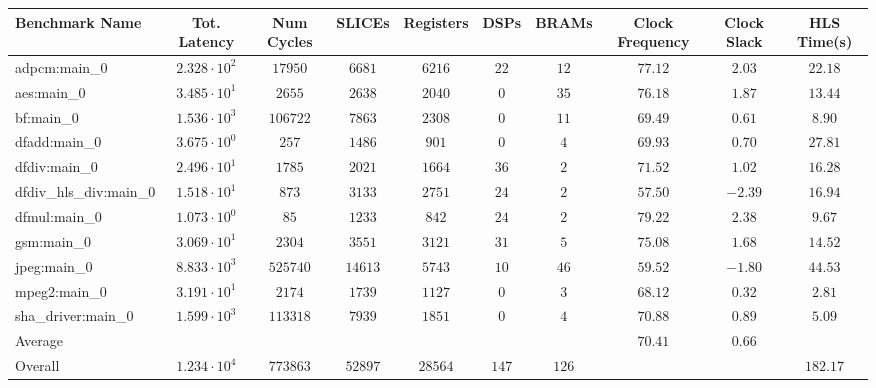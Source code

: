 \begin{tabular}{|l|c|c|c|c|c|c|c|c|c|}
\hline
Benchmark Name          & Tot. Latency           & Num Cycles & SLICEs    & Registers & DSPs    & BRAMs   & Clock Frequency & Clock Slack & HLS Time(s) \\
\hline
adpcm:main\_0           & $ 2.328 \cdot 10^{2} $ & $ 17950  $ & $ 6681  $ & $ 6216  $ & $ 22  $ & $ 12  $ & $ 77.12       $ & $ 2.03    $ & $ 22.18   $ \\
aes:main\_0             & $ 3.485 \cdot 10^{1} $ & $ 2655   $ & $ 2638  $ & $ 2040  $ & $ 0   $ & $ 35  $ & $ 76.18       $ & $ 1.87    $ & $ 13.44   $ \\
bf:main\_0              & $ 1.536 \cdot 10^{3} $ & $ 106722 $ & $ 7863  $ & $ 2308  $ & $ 0   $ & $ 11  $ & $ 69.49       $ & $ 0.61    $ & $ 8.90    $ \\
dfadd:main\_0           & $ 3.675 \cdot 10^{0} $ & $ 257    $ & $ 1486  $ & $ 901   $ & $ 0   $ & $ 4   $ & $ 69.93       $ & $ 0.70    $ & $ 27.81   $ \\
dfdiv:main\_0           & $ 2.496 \cdot 10^{1} $ & $ 1785   $ & $ 2021  $ & $ 1664  $ & $ 36  $ & $ 2   $ & $ 71.52       $ & $ 1.02    $ & $ 16.28   $ \\
dfdiv\_hls\_div:main\_0 & $ 1.518 \cdot 10^{1} $ & $ 873    $ & $ 3133  $ & $ 2751  $ & $ 24  $ & $ 2   $ & $ 57.50       $ & $ -2.39   $ & $ 16.94   $ \\
dfmul:main\_0           & $ 1.073 \cdot 10^{0} $ & $ 85     $ & $ 1233  $ & $ 842   $ & $ 24  $ & $ 2   $ & $ 79.22       $ & $ 2.38    $ & $ 9.67    $ \\
gsm:main\_0             & $ 3.069 \cdot 10^{1} $ & $ 2304   $ & $ 3551  $ & $ 3121  $ & $ 31  $ & $ 5   $ & $ 75.08       $ & $ 1.68    $ & $ 14.52   $ \\
jpeg:main\_0            & $ 8.833 \cdot 10^{3} $ & $ 525740 $ & $ 14613 $ & $ 5743  $ & $ 10  $ & $ 46  $ & $ 59.52       $ & $ -1.80   $ & $ 44.53   $ \\
mpeg2:main\_0           & $ 3.191 \cdot 10^{1} $ & $ 2174   $ & $ 1739  $ & $ 1127  $ & $ 0   $ & $ 3   $ & $ 68.12       $ & $ 0.32    $ & $ 2.81    $ \\
sha\_driver:main\_0     & $ 1.599 \cdot 10^{3} $ & $ 113318 $ & $ 7939  $ & $ 1851  $ & $ 0   $ & $ 4   $ & $ 70.88       $ & $ 0.89    $ & $ 5.09    $ \\
\hline
Average                 & $                    $ & $        $ & $       $ & $       $ & $     $ & $     $ & $ 70.41       $ & $ 0.66    $ & $         $ \\
\hline
Overall                 & $ 1.234 \cdot 10^{4} $ & $ 773863 $ & $ 52897 $ & $ 28564 $ & $ 147 $ & $ 126 $ & $             $ & $         $ & $ 182.17  $ \\
\hline
\end{tabular}
